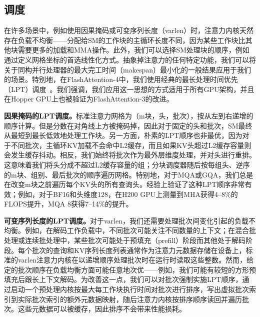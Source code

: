 \subsection{调度}
\label{sec:algo_other}

在许多场景中，例如使用因果掩码或可变序列长度（varlen）时，注意力内核天然存在负载不均衡——分配给SM的工作块的主循环长度不同，因为某些工作块比其他块需要更多的加载和MMA操作。此外，我们可以选择SM处理块的顺序，例如通过定义网格坐标的首选线性化方式。抽象掉注意力的任何特定功能，我们可以将关于同构并行处理器的最大完工时间（makespan）最小化的一般结果应用于我们的场景。特别地，在FlashAttention-4中，我们使用经典的最长处理时间优先（LPT）调度~\citep{graham1969}。我们强调，我们应用这一思想的方式适用于所有GPU架构，并且在Hopper GPU上也被验证为FlashAttention-3的改进。

\textbf{因果掩码的LPT调度。}标准注意力网格为（m块，头，批次），按从左到右递增的顺序计算。但是分数在对角线上方被掩码掉，因此对于固定的头和批次，SM最终从最短到最长低效地处理工作块。另一方面，朴素的LPT顺序也非最优，因为对于不同批次，主循环KV加载不会命中L2缓存，而且如果KV头超过L2缓存容量则会发生缓存抖动。相反，我们始终将批次作为最外层维度处理，并对头进行重排。这意味着我们将头分成不超过L2缓存容量的组；分块调度器随后按每组头、逆序的m块、组别、最后批次的顺序遍历网格。特别地，对于MQA或GQA，我们总是在改变m块之前遍历每个KV头的所有查询头。经验上验证了这种LPT顺序非常有效；例如，对于BF16和头维度128，在H200 GPU上测量到MHA获得4--8\%的FLOPS提升，MQA 8获得7--14\%的提升。

\textbf{可变序列长度的LPT调度。}对于varlen，我们还需要处理批次间变化引起的负载不均衡。例如，在解码工作负载中，不同批次可能关注不同数量的上下文；在混合批处理或连续批处理中，某些批次可能处于预填充（prefill）阶段而其他处于解码阶段。每个批次的查询和KV序列长度列表通常作为注意力元数据存储在设备上，标准的varlen注意力内核在以递增顺序处理批次时在运行时读取这些整数。然而，给定的批次顺序在负载均衡方面可能任意地次优——例如，我们可能有较短的方形预填充后跟长上下文解码。为改善这一点，我们可以对批次强制实施LPT顺序，通过启动一个预处理内核按最大每工作块执行时间对批次进行排序，写出虚拟批次索引到实际批次索引的额外元数据映射，随后注意力内核按排序顺序读回并遍历批次。这些元数据可以被缓存，因此排序不会带来性能损耗。

